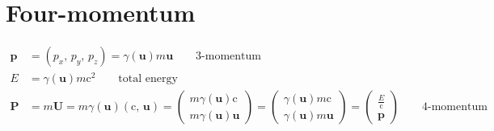 \documentclass[pagesize,headsepline,10pt,parskip=half]{scrreprt}
\renewcommand{\vec}[1]{\mathbf{#1}}
\newcommand{\parray}[2]{\left(\begin{array}{#1}#2\end{array}\right)}
\renewcommand{\c}{\mathrm{c}}
\begin{document}
    \section{Four-momentum}
      \begin{align*}
        \vec{p} & = \left(p_x, \, p_y, \, p_z\right) = \gamma\left(\vec{u}\right) m \vec{u} \qquad \text{3-momentum} \\
        E &= \gamma\left(\vec{u}\right) m \c^2 \qquad \text{total energy} \\
        \vec{P} & = m \vec{U} = m \gamma\left(\vec{u}\right)\left(\c, \, \vec{u}\right) = \parray{c}{m \gamma\left(\vec{u}\right) \c \\ m \gamma\left(\vec{u}\right) \vec{u}} = \parray{c}{\gamma\left(\vec{u}\right) m \c \\ \gamma\left(\vec{u}\right) m \vec{u}} = \parray{c}{\frac{E}{\c} \\ \vec{p}} \qquad \text{4-momentum}
      \end{align*}
\end{document}
